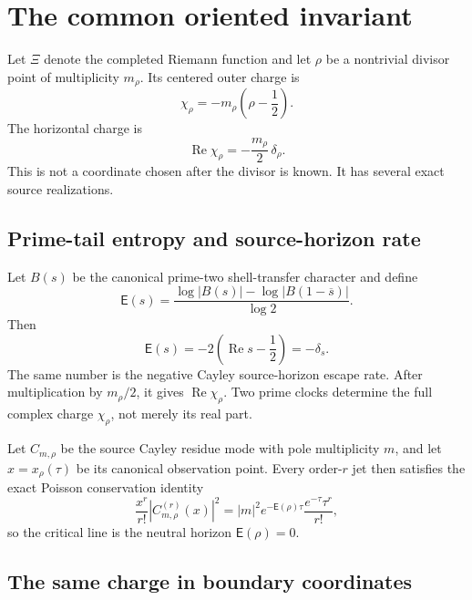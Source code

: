 \documentclass[11pt]{article}
\theoremstyle{definition}
\theoremstyle{remark}
\newcommand{\Rea}{\operatorname{Re}}
\begin{document}
\section{The common oriented invariant}
\label{sec:charge}

Let \(\Xi\) denote the completed Riemann function and let \(\rho\) be a
nontrivial divisor point of multiplicity \(m_\rho\).  Its centered outer
charge is
\[
                    \chi_\rho
                    =-m_\rho\left(\rho-\frac12\right).
\tag{2.1}\label{eq:outer-charge}
\]
The horizontal charge is
\[
             \Rea\chi_\rho
              =-\frac{m_\rho}{2}\,\delta_\rho .
\tag{2.2}\label{eq:horizontal-charge}
\]
This is not a coordinate chosen after the divisor is known.  It has
several exact source realizations.

\subsection{Prime-tail entropy and source-horizon rate}

Let \(B(s)\) be the canonical prime-two shell-transfer character and
define
\[
 \mathsf E(s)=
 \frac{\log\lvert B(s)\rvert-
       \log\lvert B(1-\overline s)\rvert}{\log2}.
\tag{2.3}\label{eq:entropy}
\]
Then
\[
 \mathsf E(s)=-2\left(\Rea s-\frac12\right)
             =-\delta_s.
\tag{2.4}\label{eq:entropy-delta}
\]
The same number is the negative Cayley source-horizon escape rate.
After multiplication by \(m_\rho/2\), it gives
\(\Rea\chi_\rho\).  Two prime clocks determine the full complex charge
\(\chi_\rho\), not merely its real part.

Let \(C_{m,\rho}\) be the source Cayley residue mode with pole multiplicity
\(m\), and let \(x=x_\rho(\tau)\) be its canonical observation point.
Every order-\(r\) jet then satisfies the exact Poisson conservation
identity
\[
 \frac{x^r}{r!}
 \left\lvert C_{m,\rho}^{(r)}(x)\right\rvert^2
 =
 |m|^2 e^{-\mathsf E(\rho)\tau}
 \frac{e^{-\tau}\tau^r}{r!},
\tag{2.5}\label{eq:poisson-conservation}
\]
so the critical line is the neutral horizon
\(\mathsf E(\rho)=0\).

\subsection{The same charge in boundary coordinates}
\end{document}

